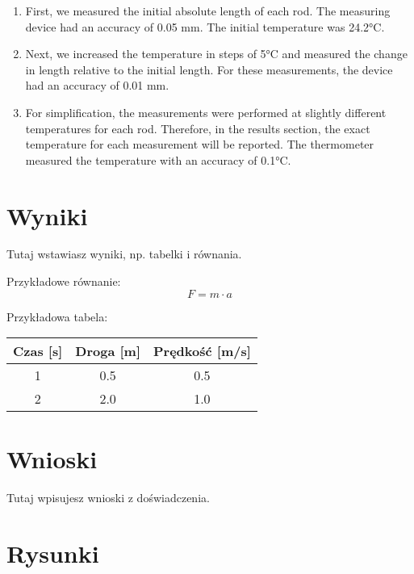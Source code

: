 \documentclass[a4paper,12pt]{article} %
\begin{document}
\begin{enumerate}
    \item First, we measured the initial absolute length of each rod. The measuring device had an accuracy of 0.05 mm. The initial temperature was 24.2°C.
    
    \item Next, we increased the temperature in steps of 5°C and measured the change in length relative to the initial length. For these measurements, the device had an accuracy of 0.01 mm. 
    
    \item For simplification, the measurements were performed at slightly different temperatures for each rod. Therefore, in the results section, the exact temperature for each measurement will be reported. The thermometer measured the temperature with an accuracy of 0.1°C.
\end{enumerate}

\section{Wyniki}
Tutaj wstawiasz wyniki, np. tabelki i równania.

Przykładowe równanie:
\begin{equation}
    F = m \cdot a
\end{equation}

Przykładowa tabela:
\begin{tabular}{c c c}
Czas [s] & Droga [m] & Prędkość [m/s] \\
\hline
1 & 0.5 & 0.5 \\
2 & 2.0 & 1.0 \\
\end{tabular}

\section{Wnioski}
Tutaj wpisujesz wnioski z doświadczenia.

\section{Rysunki}
\end{document}

